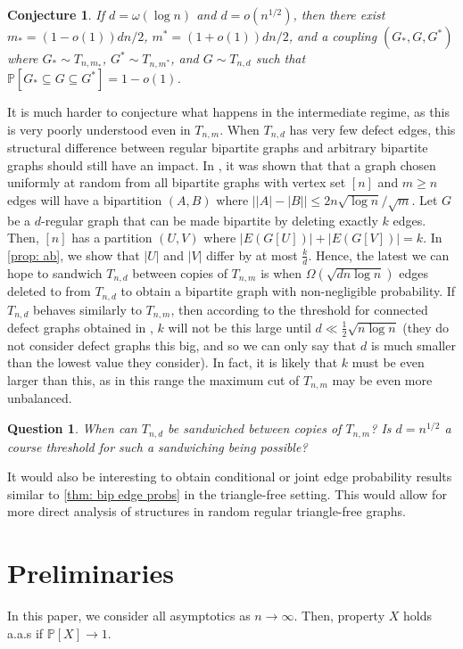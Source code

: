 \documentclass[11pt]{article}
\def\P{\mathbb P}
\theoremstyle{plain}
\newtheorem{conj}[thm]{Conjecture}
\newtheorem{que}[thm]{Question}
\begin{document}
\begin{conj}\label{conj: sparse sandwich}
    If $d = \omega(\log n)$ and $d = o(n^{1/2})$, then there exist $m_* = (1 - o(1))dn/2$, $m^* = (1 + o(1))dn/2$, and a coupling $(G_*, G, G^*)$ where $G_* \sim T_{n, m_*}$, $G^* \sim T_{n, m^*}$, and $G \sim T_{n, d}$ such that $\P[G_* \subseteq G \subseteq G^*] = 1 - o(1)$. 
\end{conj}

It is much harder to conjecture what happens in the intermediate regime, as this is very poorly understood even in $T_{n,m}$. When $T_{n,d}$ has very few defect edges, this structural difference between regular bipartite graphs and arbitrary bipartite graphs should still have an impact. 
In \cite{osthus2003densities}, it was shown that that a graph chosen uniformly at random from all bipartite graphs with vertex set $[n]$ and $m \geq n$ edges will have a bipartition $(A,B)$ where $\big ||A| - |B|\big | \leq 2n\sqrt {\log n}/\sqrt m$. Let $G$ be a $d$-regular graph that can be made bipartite by deleting exactly $k$ edges. Then, $[n]$ has a partition $(U,V)$ where $|E(G[U])| + |E(G[V])| = k$. In \cref{prop: ab}, we show that $|U|$ and $|V|$ differ by at most $\frac{k}{d}$. Hence, the latest we can hope to sandwich $T_{n,d}$ between copies of $T_{n,m}$ is when $\Omega(\sqrt{dn\log n})$ edges deleted to from $T_{n,d}$ to obtain a bipartite graph with non-negligible probability. If $T_{n,d}$ behaves similarly to $T_{n,m}$, then according to the threshold for connected defect graphs obtained in \cite{JENSSEN2025110499}, $k$ will not be this large until $d \ll \frac{1}{2}\sqrt{n \log n}$ (they do not consider defect graphs this big, and so we can only say that $d$ is much smaller than the lowest value they consider). In fact, it is likely that $k$ must be even larger than this, as in this range the maximum cut of $T_{n,m}$ may be even more unbalanced. 

\begin{que}
    When can $T_{n,d}$ be sandwiched between copies of $T_{n,m}$? Is $d = n^{1/2}$ a course threshold for such a sandwiching being possible? 
\end{que}

It would also be interesting to obtain conditional or joint edge probability results similar to \cref{thm: bip edge probs} in the triangle-free setting. This would allow for more direct analysis of structures in random regular triangle-free graphs.




\section{Preliminaries}\label{sec: preleminaries}
In this paper, we consider all asymptotics as $n \rightarrow \infty$. Then, property $X$ holds a.a.s if $\P[X] \rightarrow 1$. 
\end{document}
